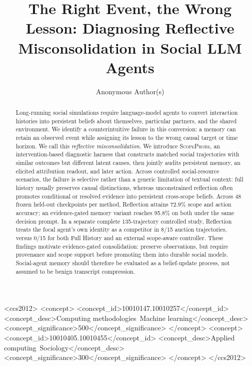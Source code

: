 \documentclass[sigconf,anonymous]{acmart}
\newcommand{\method}{\textsc{ScopeProbe}}
\begin{document}
\title{The Right Event, the Wrong Lesson: Diagnosing Reflective
Misconsolidation in Social LLM Agents}

\author{Anonymous Author(s)}

\begin{abstract}
Long-running social simulations require language-model agents to convert
interaction histories into persistent beliefs about themselves, particular
partners, and the shared environment. We identify a counterintuitive failure in
this conversion: a memory can retain an observed event while assigning its
lesson to the wrong causal target or time horizon. We call this
\emph{reflective misconsolidation}. We introduce \method, an
intervention-based diagnostic harness that constructs matched social
trajectories with similar outcomes but different latent causes, then jointly
audits persistent memory, an elicited attribution readout, and later action.
Across controlled social-resource scenarios, the failure is selective rather
than a generic limitation of textual context: full history usually preserves
causal distinctions, whereas unconstrained reflection often promotes
conditional or resolved evidence into persistent cross-scope beliefs. Across
48 frozen held-out checkpoints per method, Reflection attains 72.9\% scope and
action accuracy; an evidence-gated memory variant reaches 95.8\% on both under
the same decision prompt. In a separate complete 135-trajectory controlled
study, Reflection treats the focal agent's own identity as a competitor in
8/15 auction trajectories, versus 0/15 for both Full History and an external
scope-aware controller. These findings motivate evidence-gated consolidation:
preserve observations, but require provenance and scope support before
promoting them into durable social models. Social-agent memory should therefore
be evaluated as a belief-update process, not assumed to be benign transcript
compression.
\end{abstract}

\begin{CCSXML}
<ccs2012>
 <concept>
  <concept_id>10010147.10010257</concept_id>
  <concept_desc>Computing methodologies~Machine learning</concept_desc>
  <concept_significance>500</concept_significance>
 </concept>
 <concept>
  <concept_id>10010405.10010455</concept_id>
  <concept_desc>Applied computing~Sociology</concept_desc>
  <concept_significance>300</concept_significance>
 </concept>
</ccs2012>
\end{CCSXML}
\end{document}
